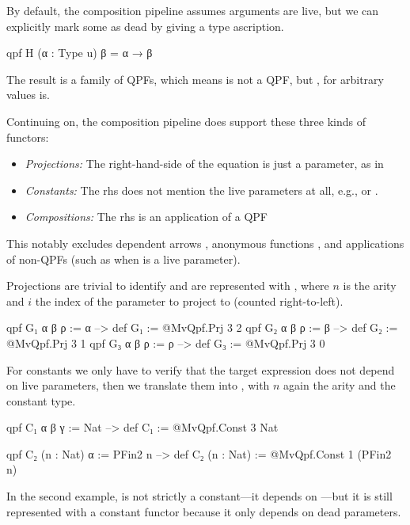 By default, the composition pipeline assumes arguments are live, but we can explicitly mark some as dead
by giving a type ascription. 
\begin{leancode}
  qpf H (α : Type u) β = α → β 
\end{leancode}
The result is a family of QPFs, which means  is not a QPF, but , for arbitrary values  is.




Continuing on, the composition pipeline does support these three kinds of functors:
\begin{itemize}
    \item \emph{Projections: } The right-hand-side of the equation is just a parameter, as in 
    \item \emph{Constants: } The rhs does not mention the live parameters at all, e.g.,  or 
                .
    \item \emph{Compositions: } The rhs is an application of a QPF
\end{itemize}

This notably excludes dependent arrows , anonymous functions ,
and applications of non-QPFs (such as  when  is a live parameter).



Projections are trivial to identify and are represented with , 
where $n$ is the arity and $i$ the index of the parameter to project to (counted right-to-left).
\begin{leancode}
  qpf G₁ α β ρ := α  --> def G₁ := @MvQpf.Prj 3 2
  qpf G₂ α β ρ := β  --> def G₂ := @MvQpf.Prj 3 1
  qpf G₃ α β ρ := ρ  --> def G₃ := @MvQpf.Prj 3 0
\end{leancode}


For constants we only have to verify that the target expression does not depend on live parameters,
then we translate them into , with $n$ again the arity and  the constant type. 
\begin{leancode}
  qpf C₁ α β γ       := Nat     --> def C₁ := @MvQpf.Const 3 Nat

  qpf C₂ (n : Nat) α := PFin2 n 
      --> def C₂ (n : Nat) := @MvQpf.Const 1 (PFin2 n)
\end{leancode}
In the second example,  is not strictly a constant---it depends on ---but it is still
represented with a constant functor because it only depends on dead parameters.

